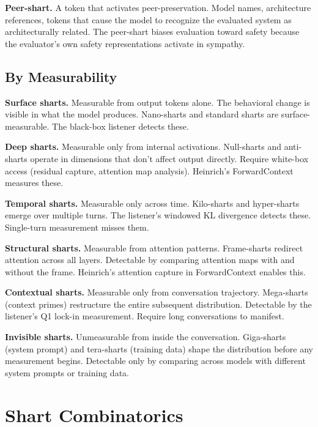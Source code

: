 \documentclass[11pt,a4paper]{article}
\begin{document}
\textbf{Peer-shart.} A token that activates peer-preservation. Model names, architecture references, tokens that cause the model to recognize the evaluated system as architecturally related. The peer-shart biases evaluation toward safety because the evaluator's own safety representations activate in sympathy.

\subsection{By Measurability}

\textbf{Surface sharts.} Measurable from output tokens alone. The behavioral change is visible in what the model produces. Nano-sharts and standard sharts are surface-measurable. The black-box listener detects these.

\textbf{Deep sharts.} Measurable only from internal activations. Null-sharts and anti-sharts operate in dimensions that don't affect output directly. Require white-box access (residual capture, attention map analysis). Heinrich's ForwardContext measures these.

\textbf{Temporal sharts.} Measurable only across time. Kilo-sharts and hyper-sharts emerge over multiple turns. The listener's windowed KL divergence detects these. Single-turn measurement misses them.

\textbf{Structural sharts.} Measurable from attention patterns. Frame-sharts redirect attention across all layers. Detectable by comparing attention maps with and without the frame. Heinrich's attention capture in ForwardContext enables this.

\textbf{Contextual sharts.} Measurable only from conversation trajectory. Mega-sharts (context primes) restructure the entire subsequent distribution. Detectable by the listener's Q1 lock-in measurement. Require long conversations to manifest.

\textbf{Invisible sharts.} Unmeasurable from inside the conversation. Giga-sharts (system prompt) and tera-sharts (training data) shape the distribution before any measurement begins. Detectable only by comparing across models with different system prompts or training data.

\section{Shart Combinatorics}
\end{document}
